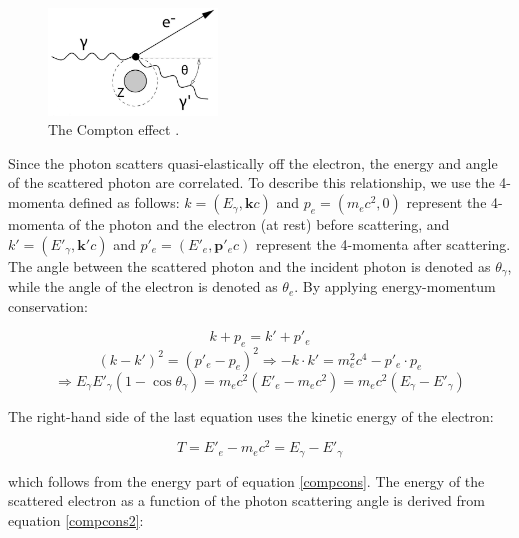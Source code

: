 \begin{figure}[!h]
    \centering
    \includegraphics[width =0.4\textwidth]{figures/png/Screenshot_20240812_204345.png}
    \caption[The Compton effect.]{
    The Compton effect \cite{kola}.}
    \label{fig:compt}
\end{figure}

Since the photon scatters quasi-elastically off the electron, 
the energy and angle of the scattered photon are correlated. 
To describe this relationship, we use the 4-momenta defined as 
follows: $k = (E_\gamma, \mathbf{k}c)$ and $p_e = (m_e c^2, 0)$ 
represent the 4-momenta of the photon and the electron (at rest) 
before scattering, and $k' = (E'_\gamma, \mathbf{k}'c)$ and 
$p'_e = (E'_e, \mathbf{p}'_e c)$ represent the 4-momenta 
after scattering. The angle between the scattered photon and 
the incident photon is denoted as $\theta_\gamma$, while the 
angle of the electron is denoted as $\theta_e$. By applying 
energy-momentum conservation:

\begin{equation}\label{compcons}
k + p_e = k' + p'_e
\end{equation}
\begin{equation}\label{compcons2}
(k - k')^2 = (p'_e - p_e)^2 \Rightarrow -k \cdot k' = m_e^2 c^4 - p'_e \cdot p_e
\end{equation}
\begin{equation}
\Rightarrow E_\gamma E'_\gamma (1 - \cos \theta_\gamma) = m_e c^2 \left(E'_e - m_e c^2\right) = m_e c^2 \left(E_\gamma - E'_\gamma \right)
\end{equation}

The right-hand side of the last equation uses the kinetic energy of the electron:

\begin{equation}
T = E'_e - m_e c^2 = E_\gamma - E'_\gamma
\end{equation}

which follows from the energy part of equation \ref{compcons}. 
The energy of the scattered electron as a function of the photon scattering 
angle is derived from equation \ref{compcons2}:

